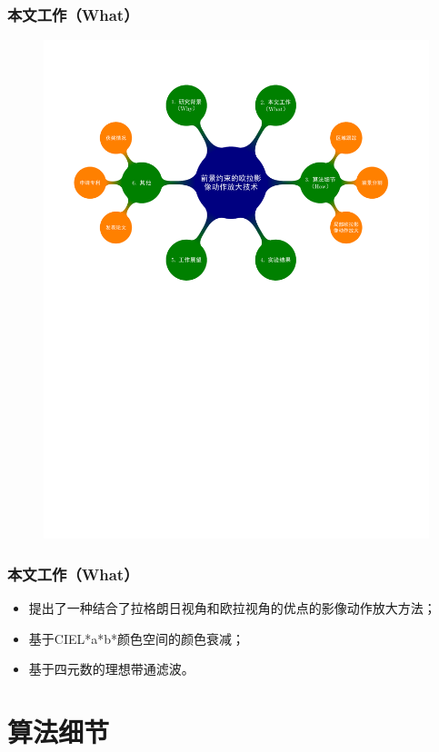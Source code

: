 \documentclass[xcolor=svgnames,serif,table,10pt]{beamer}
\begin{document}
\begin{frame}
  \frametitle{本文工作（What）}
  \vspace{-2.5em}
  \begin{figure}
    \centering
    \includegraphics[width=\textwidth, page=3]{mindmap.pdf}
  \end{figure}
\end{frame}

\begin{frame}
  \frametitle{本文工作（What）}
  \begin{itemize}[<+->]
  \item 提出了一种结合了拉格朗日视角和欧拉视角的优点的影像动作放大方法；
  \item 基于CIEL*a*b*颜色空间的颜色衰减；
  \item 基于四元数的理想带通滤波。
  \end{itemize}
\end{frame}

\section{算法细节}
\end{document}
